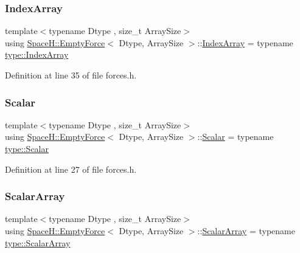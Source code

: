 \subsubsection{\texorpdfstring{Index\+Array}{IndexArray}}
{\footnotesize\ttfamily template$<$typename Dtype , size\+\_\+t Array\+Size$>$ \\
using \mbox{\hyperlink{struct_space_h_1_1_empty_force}{Space\+H\+::\+Empty\+Force}}$<$ Dtype, Array\+Size $>$\+::\mbox{\hyperlink{struct_space_h_1_1_empty_force_a25e0bd933dd3715e315c1abdb6843c36}{Index\+Array}} =  typename \mbox{\hyperlink{struct_space_h_1_1_proto_type_a276a37c81faf08681b57e8082f3f6c1b}{type\+::\+Index\+Array}}}



Definition at line 35 of file forces.\+h.

\mbox{\label{struct_space_h_1_1_empty_force_a708ead350efe0aa6f7bf1c0909ee6f28}} 
\subsubsection{\texorpdfstring{Scalar}{Scalar}}
{\footnotesize\ttfamily template$<$typename Dtype , size\+\_\+t Array\+Size$>$ \\
using \mbox{\hyperlink{struct_space_h_1_1_empty_force}{Space\+H\+::\+Empty\+Force}}$<$ Dtype, Array\+Size $>$\+::\mbox{\hyperlink{struct_space_h_1_1_empty_force_a708ead350efe0aa6f7bf1c0909ee6f28}{Scalar}} =  typename \mbox{\hyperlink{struct_space_h_1_1_proto_type_af3c8245d83d9db64749882920de5c274}{type\+::\+Scalar}}}



Definition at line 27 of file forces.\+h.

\mbox{\label{struct_space_h_1_1_empty_force_afdeb66410650cdb1e2e3b1e1fd79540c}} 
\subsubsection{\texorpdfstring{Scalar\+Array}{ScalarArray}}
{\footnotesize\ttfamily template$<$typename Dtype , size\+\_\+t Array\+Size$>$ \\
using \mbox{\hyperlink{struct_space_h_1_1_empty_force}{Space\+H\+::\+Empty\+Force}}$<$ Dtype, Array\+Size $>$\+::\mbox{\hyperlink{struct_space_h_1_1_empty_force_afdeb66410650cdb1e2e3b1e1fd79540c}{Scalar\+Array}} =  typename \mbox{\hyperlink{struct_space_h_1_1_proto_type_a09ef91dc8a37a044c403f5a833044725}{type\+::\+Scalar\+Array}}}



